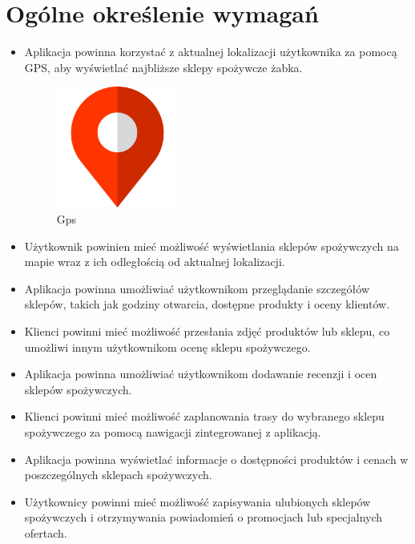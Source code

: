 \newpage
\section{Ogólne określenie wymagań}

\begin{itemize}
	\item Aplikacja powinna korzystać z aktualnej lokalizacji użytkownika za pomocą GPS, aby wyświetlać najbliższe sklepy spożywcze żabka.
	\begin{figure}[!hbt]
		\begin{center}
			\includegraphics[width=4cm]{rys/gps-icon.png}
			\caption{Gps}
			\label{rys:ustawienia}
		\end{center}
	\end{figure}
	\item Użytkownik powinien mieć możliwość wyświetlania sklepów spożywczych na mapie wraz z ich odległością od aktualnej lokalizacji.
	\item Aplikacja powinna umożliwiać użytkownikom przeglądanie szczegółów sklepów, takich jak godziny otwarcia, dostępne produkty i oceny klientów.
	\item Klienci powinni mieć możliwość przesłania zdjęć produktów lub sklepu, co umożliwi innym użytkownikom ocenę sklepu spożywczego.
	\item Aplikacja powinna umożliwiać użytkownikom dodawanie recenzji i ocen sklepów spożywczych.
	\item Klienci powinni mieć możliwość zaplanowania trasy do wybranego sklepu spożywczego za pomocą nawigacji zintegrowanej z aplikacją.
	\item Aplikacja powinna wyświetlać informacje o dostępności produktów i cenach w poszczególnych sklepach spożywczych.
	\item Użytkownicy powinni mieć możliwość zapisywania ulubionych sklepów spożywczych i otrzymywania powiadomień o promocjach lub specjalnych ofertach.	
\end{itemize}

